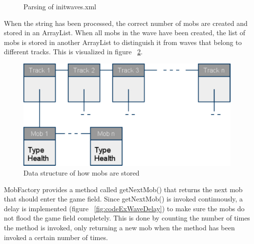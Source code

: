 \begin{figure}[htb]

\begin{small}

\end{small}

\caption{Parsing of initwaves.xml}
\label{fig:codeExMobCreationWave}

\end{figure}

When the string has been processed, the correct number of mobs are created and stored in an ArrayList. When all mobs in the wave have been created, the list of mobs is stored in another ArrayList to distinguish it from waves that belong to different tracks. This is visualized in figure ~\ref{fig:dataStructureWave}.

\begin{figure}[here]

\begin{center}
\includegraphics[scale=0.5]{pics/chapters/chapter4/moblist2}
\end{center}

\caption{Data structure of how mobs are stored}
\label{fig:dataStructureWave}

\end{figure}

MobFactory provides a method called getNextMob() that returns the next mob that should enter the game field. Since getNextMob() is invoked continuously, a delay is implemented (figure ~\ref{fig:codeExWaveDelay}) to make sure the mobs do not flood the game field completely. This is done by counting the number of times the method is invoked, only returning a new mob when the method has been invoked a certain number of times.

